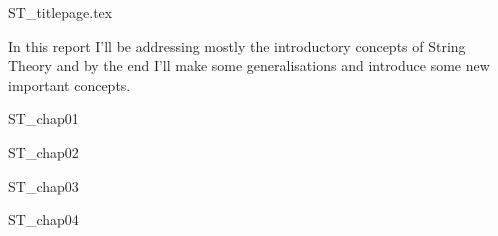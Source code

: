 \documentclass[oneside, 12pt]{book}
\begin{document}
\frontmatter \pagestyle{empty}

{ST_titlepage.tex}

\begin{bookabstract}
In this report I'll be addressing mostly the introductory concepts of String Theory and by the end I'll make some generalisations and introduce some new important concepts.
\end{bookabstract}

\centeredtoc

\mainmatter \pagestyle{mypage2} \normalfont

{ST_chap01}

{ST_chap02}

{ST_chap03}

{ST_chap04}

\backmatter %

\end{document}

